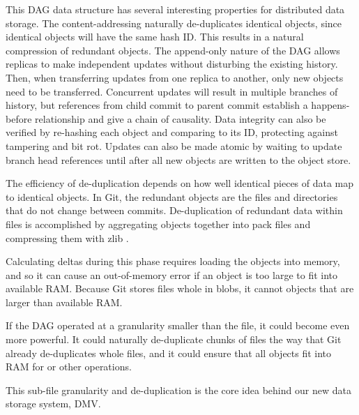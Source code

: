 This DAG data structure has several interesting properties for distributed data storage.
The content-addressing naturally de-duplicates identical objects, since identical objects will have the same hash ID.
This results in a natural compression of redundant objects.
The append-only nature of the DAG allows replicas to make independent updates without disturbing the existing history.
Then, when transferring updates from one replica to another, only new objects need to be transferred.
Concurrent updates will result in multiple branches of history, but references from child commit to parent commit establish a happens-before relationship and give a chain of causality.
Data integrity can also be verified by re-hashing each object and comparing to its ID, protecting against tampering and bit rot.
Updates can also be made atomic by waiting to update branch head references until after all new objects are written to the object store.

The efficiency of de-duplication depends on how well identical pieces of data map to identical objects.
In Git, the redundant objects are the files and directories that do not change between commits.
De-duplication of redundant data within files is accomplished by aggregating objects together into pack files and compressing them with zlib \cite[Section 10.4]{git_book}.

Calculating deltas during this  phase requires loading the objects into memory, and so it can cause an out-of-memory error if an object is too large to fit into available RAM.
Because Git stores files whole in \glspl{blob}, it cannot  objects that are larger than available RAM.

If the \gls{DAG} operated at a granularity smaller than the file, it could become even more powerful.
It could naturally de-duplicate chunks of files the way that Git already de-duplicates whole files, and it could ensure that all objects fit into RAM for  or other operations.

This sub-file granularity and de-duplication is the core idea behind our new data storage system, \acrlong{DMV}.

%
